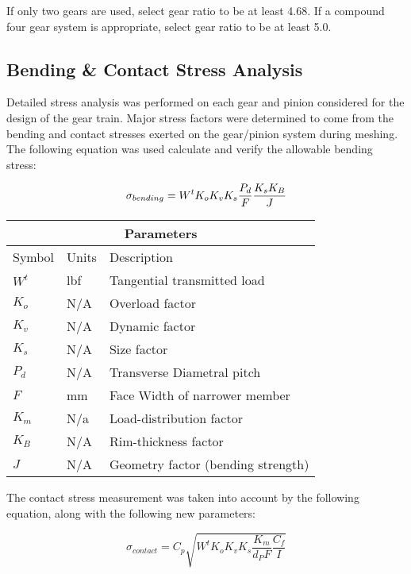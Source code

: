 \documentclass[letterpaper,12pt]{article}
\begin{document}
If only two gears are used, select gear ratio to be at least 4.68. If a compound four gear system is appropriate, select gear ratio to be at least 5.0.

\subsection{Bending \& Contact Stress Analysis}

Detailed stress analysis was performed on each gear and pinion considered for the design of the gear train. Major stress factors were determined to come from the bending and contact stresses exerted on the gear/pinion system during meshing. The following equation was used calculate and verify the allowable bending stress:

\begin{equation}
\sigma_{bending} = W^t K_o K_v K_s \frac{P_d}{F}\frac{K_s K_B}{J} \\
\end{equation}

\begin{center}
	\begin{tabular}{ |p{2cm}||p{2cm}|p{7cm}|  }
		\hline
		\multicolumn{3}{|c|}{Parameters} \\
		\hline
		Symbol & Units & Description\\
		\hline
		$W^t$ & lbf & Tangential transmitted load\\
		$K_o$ & N/A & Overload factor\\
		$K_v$ & N/A &  Dynamic factor\\
		$K_s$ & N/A & Size factor\\
		$P_{d}$ & N/A & Transverse Diametral pitch\\
		$F$ & mm & Face Width of narrower member\\
		$K_m$ & N/a & Load-distribution factor\\
		$K_{B}$ & N/A & Rim-thickness factor\\
		$J$ & N/A & Geometry factor (bending strength)\\
		\hline
	\end{tabular}
\end{center}

\noindent The contact stress measurement was taken into account by the following equation, along with the following new parameters:

\begin{equation}
\sigma_{contact} = C_{p}\sqrt{W^t K_o K_v K_s \frac{K_m}{d_P F}\frac{C_f}{I}}
\end{equation}
\end{document}
